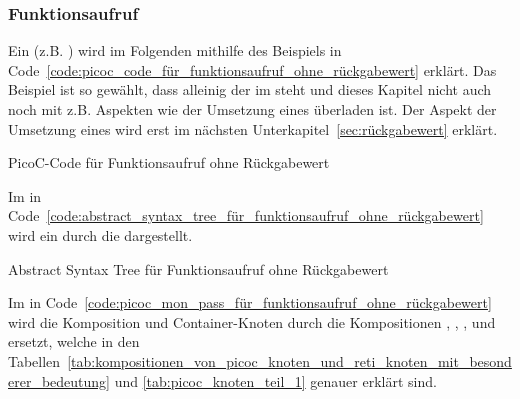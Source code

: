 \subsubsection{Funktionsaufruf}

Ein  (z.B. ) wird im Folgenden mithilfe des Beispiels in Code~\ref{code:picoc_code_für_funktionsaufruf_ohne_rückgabewert} erklärt. Das Beispiel ist so gewählt, dass alleinig der  im  steht und dieses Kapitel nicht auch noch mit z.B. Aspekten wie der Umsetzung eines  überladen ist. Der Aspekt der Umsetzung eines  wird erst im nächsten Unterkapitel~\ref{sec:rückgabewert} erklärt.


\begin{code}
  \centering
  \caption{PicoC-Code für Funktionsaufruf ohne Rückgabewert}
  \label{code:picoc_code_für_funktionsaufruf_ohne_rückgabewert}
\end{code}

Im  in Code~\ref{code:abstract_syntax_tree_für_funktionsaufruf_ohne_rückgabewert} wird ein   durch die   dargestellt.

\begin{code}
  \centering
  \caption{Abstract Syntax Tree für Funktionsaufruf ohne Rückgabewert}
  \label{code:abstract_syntax_tree_für_funktionsaufruf_ohne_rückgabewert}
\end{code}

Im  in Code~\ref{code:picoc_mon_pass_für_funktionsaufruf_ohne_rückgabewert} wird die Komposition und Container-Knoten  durch die Kompositionen , , ,  und  ersetzt, welche in den Tabellen~\ref{tab:kompositionen_von_picoc_knoten_und_reti_knoten_mit_besonderer_bedeutung} und \ref{tab:picoc_knoten_teil_1} genauer erklärt sind.

